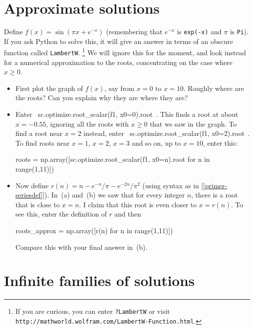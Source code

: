 \documentclass[a4paper,10pt]{amsbook}
\begin{document}
\section{Approximate solutions}

\begin{exercise}\label{ex-adjusted-sin}
 Define $f(x)=\sin(\pi x+e^{-x})$ (remembering that $e^{-x}$ is
 \verb~exp(-x)~ and $\pi$ is \verb~Pi~).  If you ask Python to solve
 this, it will give an answer in terms of an obscure function called
 \verb~LambertW~.  \footnote{If you are curious, you can enter
   \verb~?LambertW~ or visit
   \verb~http://mathworld.wolfram.com/LambertW-Function.html~.} 
 We will ignore this for the moment, and look instead for a numerical
 approximation to the roots, concentrating on the case where
 $x\geq 0$.
 \begin{itemize}
  \item[(a)] First plot the graph of $f(x)$, say from $x=0$ to $x=10$. 
   Roughly where are the roots?  Can you explain why they are where
   they are? 
  \item[(b)] Enter \pcode~sc.optimize.root_scalar(f1, x0=0).root~.
   This finds a root at about $x=-0.55$, ignoring all the roots with
   $x\geq 0$ that we saw in the graph.  To find a root near $x=2$
   instead, enter \pcode~sc.optimize.root_scalar(f1, x0=2).root~.
   To find roots near $x=1$, $x=2$, $x=3$ and so on, up to $x=10$,
   enter this:
\begin{pcodeblock}
   roots = np.array([sc.optimize.root_scalar(f1, x0=n).root for n in range(1,11)])
\end{pcodeblock}
  \item[(c)] Now define $r(n)=n-e^{-n}/\pi-e^{-2n}/\pi^2$
   (using syntax as in [\ref{primer-seriesdef}]).  In~(a)
   and~(b) we saw that for every integer $n$, there is a root that is
   close to $x=n$.  I claim that this root is even closer to
   $x=r(n)$.  To see this, enter the definition of $r$ and then 
\begin{pcodeblock}
  roots_approx = np.array([r(n) for n in range(1,11)])
\end{pcodeblock}
   Compare this with your final answer in~(b). 
 \end{itemize}
\end{exercise}

\section{Infinite families of solutions}
\end{document}
